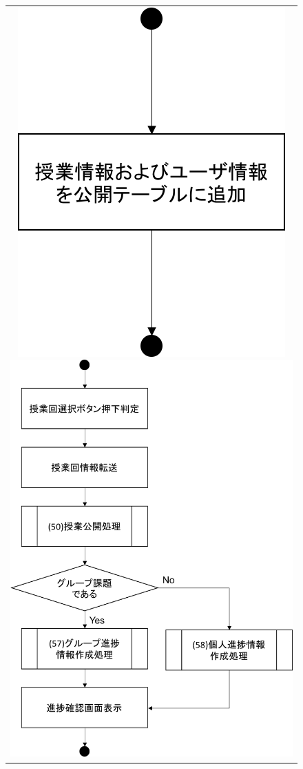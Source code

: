 \begin{figure}[htbp]
  \begin{tabular}{c}
 \begin{minipage}{0.33\hsize}
  \begin{center}
   \includegraphics[width=0.8\linewidth,clip]{./img/flow/51.png}
  \end{center}
 \end{minipage}
 \begin{minipage}{0.33\hsize}
  \begin{center}
   \includegraphics[width=0.8\linewidth,clip]{./img/flow/52.png}

\end{center}
\end{minipage}
\end{tabular}
\end{figure}
